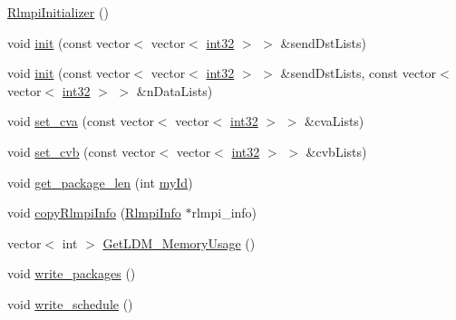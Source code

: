 \begin{DoxyCompactItemize}
\item 
\mbox{\hyperlink{classRlmpiInitializer_a658d6a4ceeadcc2101eea81790fe02a9}{Rlmpi\+Initializer}} ()
\item 
void \mbox{\hyperlink{classRlmpiInitializer_ac6e0829290daa590b36ef4cb7df852f0}{init}} (const vector$<$ vector$<$ \mbox{\hyperlink{include_2RlmpiShared_8h_a56f1a81c92849566ae864511088eb7e8}{int32}} $>$ $>$ \&send\+Dst\+Lists)
\item 
void \mbox{\hyperlink{classRlmpiInitializer_ad23febf3d25fd76c52e2488d00b0ba09}{init}} (const vector$<$ vector$<$ \mbox{\hyperlink{include_2RlmpiShared_8h_a56f1a81c92849566ae864511088eb7e8}{int32}} $>$ $>$ \&send\+Dst\+Lists, const vector$<$ vector$<$ \mbox{\hyperlink{include_2RlmpiShared_8h_a56f1a81c92849566ae864511088eb7e8}{int32}} $>$ $>$ \&n\+Data\+Lists)
\item 
void \mbox{\hyperlink{classRlmpiInitializer_a8473df40ea79d01a8c6fcc1b7c8821ba}{set\+\_\+cva}} (const vector$<$ vector$<$ \mbox{\hyperlink{include_2RlmpiShared_8h_a56f1a81c92849566ae864511088eb7e8}{int32}} $>$ $>$ \&cva\+Lists)
\item 
void \mbox{\hyperlink{classRlmpiInitializer_a5b19bad74e8bdd02208de813906e86ca}{set\+\_\+cvb}} (const vector$<$ vector$<$ \mbox{\hyperlink{include_2RlmpiShared_8h_a56f1a81c92849566ae864511088eb7e8}{int32}} $>$ $>$ \&cvb\+Lists)
\item 
void \mbox{\hyperlink{classRlmpiInitializer_af4a1204487b7792e57a9731187ba050b}{get\+\_\+package\+\_\+len}} (int \mbox{\hyperlink{test_2directSegment_2directSegmentIterator__slave_8c_aeaf12029768109487cb0540ba258af5a}{my\+Id}})
\item 
void \mbox{\hyperlink{classRlmpiInitializer_ad8f197f08ce0145b6fda9a2b973b615a}{copy\+Rlmpi\+Info}} (\mbox{\hyperlink{structRlmpiInfo}{Rlmpi\+Info}} $\ast$rlmpi\+\_\+info)
\item 
vector$<$ int $>$ \mbox{\hyperlink{classRlmpiInitializer_a670d05937360d5f4146bcb3ace7dc6d9}{Get\+L\+D\+M\+\_\+\+Memory\+Usage}} ()
\item 
void \mbox{\hyperlink{classRlmpiInitializer_a1d5c7addc4a0d39152ac81ebec7726bb}{write\+\_\+packages}} ()
\item 
void \mbox{\hyperlink{classRlmpiInitializer_a97d48ddb124af75c09509e63cc327246}{write\+\_\+schedule}} ()
\end{DoxyCompactItemize}
